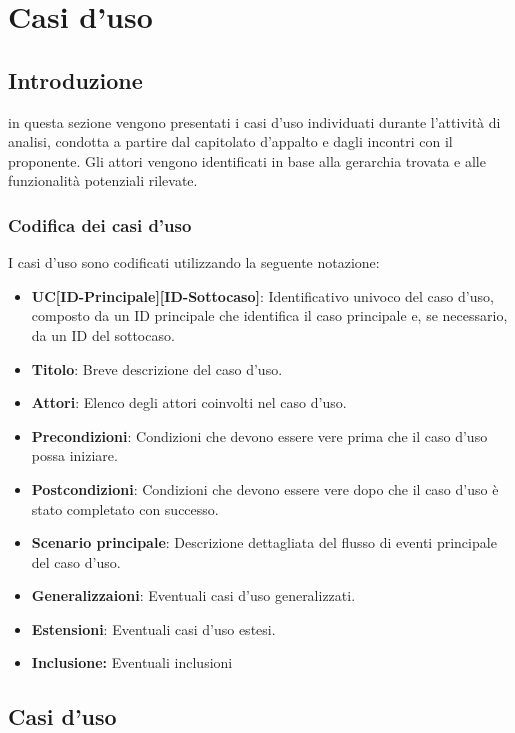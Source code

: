 \section{Casi d'uso}

\subsection{Introduzione}
in questa sezione vengono presentati i casi d'uso individuati durante l'attività di analisi, 
condotta a partire dal capitolato d'appalto e dagli incontri con il proponente. 
Gli attori vengono identificati in base alla gerarchia trovata e 
alle funzionalità potenziali rilevate.

\subsubsection{Codifica dei casi d'uso}
I casi d'uso sono codificati utilizzando la seguente notazione:

\begin{itemize}
    \item \textbf{UC[ID-Principale][ID-Sottocaso]}: Identificativo univoco del caso d'uso, composto da un ID principale che identifica il caso principale e, se necessario, da un ID del sottocaso.
    \item \textbf{Titolo}: Breve descrizione del caso d'uso.
    \item \textbf{Attori}: Elenco degli attori coinvolti nel caso d'uso.
    \item \textbf{Precondizioni}: Condizioni che devono essere vere prima che il caso d'uso possa iniziare.
    \item \textbf{Postcondizioni}: Condizioni che devono essere vere dopo che il caso d'uso è stato completato con successo.
    \item \textbf{Scenario principale}: Descrizione dettagliata del flusso di eventi principale del caso d'uso.
    \item \textbf{Generalizzaioni}: Eventuali casi d'uso generalizzati.
    \item \textbf{Estensioni}: Eventuali casi d'uso estesi.
    \item \textbf{Inclusione:} Eventuali inclusioni
\end{itemize}
\newpage
\subsection{Casi d'uso}

